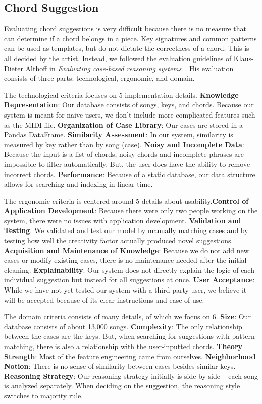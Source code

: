 \documentclass[letterpaper]{article}
\begin{document}
\subsection{Chord Suggestion}

Evaluating chord suggestions is very difficult because there is no measure that can determine if a chord belongs in a piece. Key signatures and common patterns can be used as templates, but do not dictate the correctness of a chord. This is all decided by the artist. Instead, we followed the evaluation guidelines of Klaus-Dieter Althoff in \textit{Evaluating case-based reasoning systems}~\cite{althoff1995evaluating}. His evaluation consists of three parts: technological, ergonomic, and domain. 

The technological criteria focuses on 5 implementation details. \textbf{Knowledge Representation}: Our database consists of songs, keys, and chords. Because our system is meant for naive users, we don't include more complicated features such as the MIDI file. \textbf{Organization of Case Library}: Our cases are stored in a Pandas DataFrame. \textbf{Similarity Assessment}: In our system, similarity is measured by key rather than by song (case). \textbf{Noisy and Incomplete Data}: Because the input is a list of chords, noisy chords and incomplete phrases are impossible to filter automatically. But, the user does have the ability to remove incorrect chords. \textbf{Performance}: Because of a static database, our data structure allows for searching and indexing in linear time.

The ergonomic criteria is centered around 5 details about usability.\textbf{Control of Application Development}: Because there were only two people working on the system, there were no issues with application development. \textbf{Validation and Testing}. We validated and test our model by manually matching cases and by testing how well the creativity factor actually produced novel suggestions. \textbf{Acquisition and Maintenance of Knowledge}: Because we do not add new cases or modify existing cases, there is no maintenance needed after the initial cleaning. \textbf{Explainability}: Our system does not directly explain the logic of each individual suggestion but instead for all suggestions at once. \textbf{User Acceptance}: While we have not yet tested our system with a third party user, we believe it will be accepted because of its clear instructions and ease of use. 

The domain criteria consists of many details, of which we focus on 6. \textbf{Size}: Our database consists of about 13,000 songs. \textbf{Complexity}: The only relationship between the cases are the keys. But, when searching for suggestions with pattern matching, there is also a relationship with the user-inputted chords. \textbf{Theory Strength}: Most of the feature engineering came from ourselves. \textbf{Neighborhood Notion}: There is no sense of similarity between cases besides similar keys. \textbf{Reasoning Strategy}: Our reasoning strategy initially is side by side -- each song is analyzed separately. When deciding on the suggestion, the reasoning style switches to majority rule.
\end{document}
